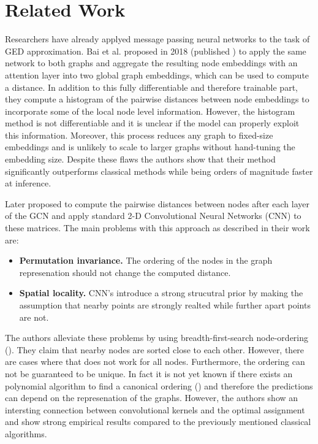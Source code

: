 \section{Related Work}

Researchers have already applyed message passing neural networks to the task of GED approximation. Bai et al. proposed in 2018 (published \citealp{bai2019}) to apply the same network to both graphs and aggregate the resulting node embeddings with an attention layer into two global graph embeddings, which can be used to compute a distance. In addition to this fully differentiable and therefore trainable part, they compute a histogram of the pairwise distances between node embeddings to incorporate some of the local node level information. However, the histogram method is not differentiable and it is unclear if the model can properly exploit this information. Moreover, this process reduces any graph to fixed-size embeddings and is unlikely to scale to larger graphs without hand-tuning the embedding size. Despite these flaws the authors show that their method significantly outperforms classical methods while being orders of magnitude faster at inference.

Later \cite{bai2018_cnn1} proposed to compute the pairwise distances between nodes after each layer of the GCN and apply standard 2-D Convolutional Neural Networks (CNN) to these matrices. The main problems with this approach as described in their work are:
\begin{itemize}
     \item \textbf{Permutation invariance.} The ordering of the nodes in the graph represenation should not change the computed distance.
     \item \textbf{Spatial locality.} CNN's introduce a strong strucutral prior by making the assumption that nearby points are strongly realted while further apart points are not.
\end{itemize}
The authors alleviate these problems by using breadth-first-search node-ordering (\citealp{bfs2018}). They claim that nearby nodes are sorted close to each other. However, there are cases where that does not work for all nodes. Furthermore, the ordering can not be guaranteed to be unique. In fact it is not yet known if there exists an polynomial algorithm to find a canonical ordering (\citealp{canonical2016}) and therefore the predictions can depend on the represenation of the graphs. However, the authors show an intersting connection between convolutional kernels and the optimal assignment and show strong empirical results compared to the previously mentioned classical algorithms.

